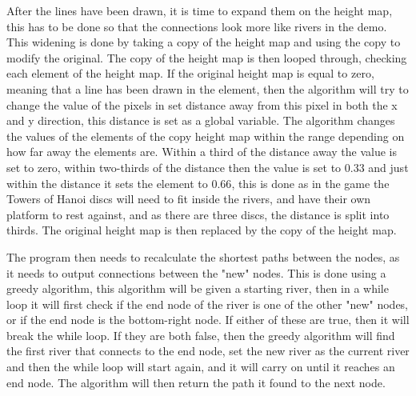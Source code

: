 	After the lines have been drawn, it is time to expand them on the height map, this has to be done so that the connections look more like rivers in the demo. This widening is done by taking a copy of the height map and using the copy to modify the original. The copy of the height map is then looped through, checking each element of the height map. If the original height map is equal to zero, meaning that a line has been drawn in the element, then the algorithm will try to change the value of the pixels in set distance away from this pixel in both the x and y direction, this distance is set as a global variable. The algorithm changes the values of the elements of the copy height map within the range depending on how far away the elements are. Within a third of the distance away the value is set to zero, within two-thirds of the distance then the value is set to $0.33$ and just within the distance it sets the element to $0.66$, this is done as in the game the Towers of Hanoi discs will need to fit inside the rivers, and have their own platform to rest against, and as there are three discs, the distance is split into thirds. The original height map is then replaced by the copy of the height map.
	\newline
	\par

	

	The program then needs to recalculate the shortest paths between the nodes, as it needs to output connections between the "new" nodes. This is done using a greedy algorithm, this algorithm will be given a starting river, then in a while loop it will first check if the end node of the river is one of the other "new" nodes, or if the end node is the bottom-right node. If either of these are true, then it will break the while loop. If they are both false, then the greedy algorithm will find the first river that connects to the end node, set the new river as the current river and then the while loop will start again, and it will carry on until it reaches an end node. The algorithm will then return the path it found to the next node.
	\newline
	\par


